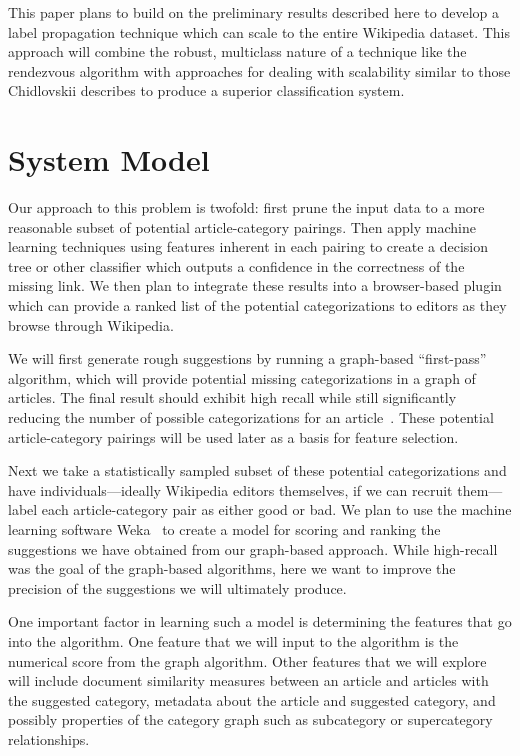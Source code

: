 \documentclass[]{sig-alternate}
\begin{document}
This paper plans to build on the preliminary results described here to develop a label propagation technique which can scale to the entire Wikipedia dataset. This approach will combine the robust, multiclass nature of a technique like the rendezvous algorithm with approaches for dealing with scalability similar to those Chidlovskii describes to produce a superior classification system.

\section{System Model}
\label{sec:system_model}
Our approach to this problem is twofold: first prune the input data to a more reasonable subset of potential article-category pairings. Then apply machine learning techniques using features inherent in each pairing to create a decision tree or other classifier which outputs a confidence in the correctness of the missing link. We then plan to integrate these results into a browser-based plugin which can provide a ranked list of the potential categorizations to editors as they browse through Wikipedia.

We will first generate rough suggestions by running a graph-based ``first-pass'' algorithm, which will provide potential missing categorizations in a graph of articles. The final result should exhibit high recall while still significantly reducing the number of possible categorizations for an article~\cite{Avrachenkov}. These potential article-category pairings will be used later as a basis for feature selection.

Next we take a statistically sampled subset of these potential categorizations and have individuals---ideally Wikipedia editors themselves, if we can recruit them---label each article-category pair as either good or bad. We plan to use the machine learning software Weka~\cite{Weka} to create a model for scoring and ranking the suggestions we have obtained from our graph-based approach. While high-recall was the goal of the graph-based algorithms, here we want to improve the precision of the suggestions we will ultimately produce. 

One important factor in learning such a model is determining the features that go into the algorithm. One feature that we will input to the algorithm is the numerical score from the graph algorithm. Other features that we will explore will include document similarity measures between an article and articles with the suggested category, metadata about the article and suggested category, and possibly properties of the category graph such as subcategory or supercategory relationships.
\end{document}
